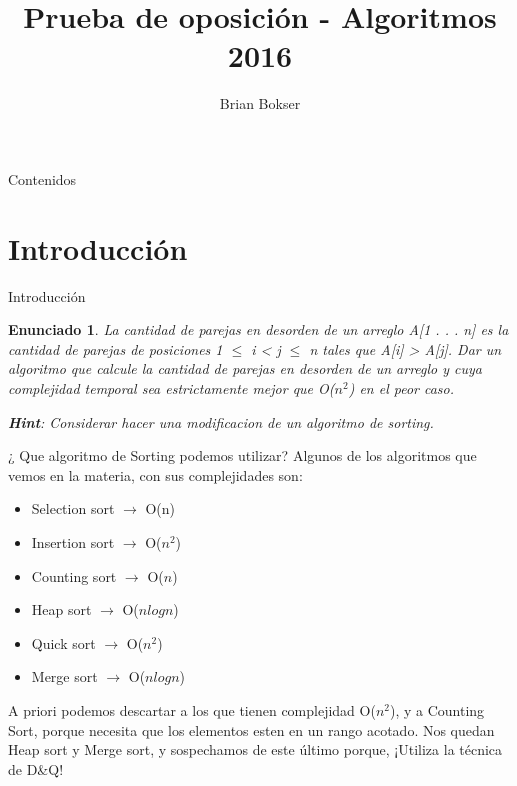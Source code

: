 \documentclass[pdf]{beamer}
\title[Prueba de oposición] %
{Prueba de oposición - Algoritmos 2016}
\author[Brian Bokser] %
{Brian Bokser}
\institute[UBA-FCEN] %
{
  Facultad de Ciencias Exactas y Naturales\\
  Universidad de Buenos Aires
}
\begin{document}
\begin{frame}
  \titlepage
\end{frame}

\begin{frame}{Contenidos}
  \tableofcontents
\end{frame}



\section{Introducci\'on}

\begin{frame}{Introducción}

\newtheorem{enun}{Enunciado}


\begin{enun}
    \par{
    La cantidad de parejas en desorden de un arreglo A[1 . . . n] es la cantidad de parejas de posiciones 1 $\leq$ i <
    j $\leq$ n tales que A[i] > A[j]. Dar un algoritmo que calcule la cantidad de parejas en desorden de un arreglo
    y cuya complejidad temporal sea estrictamente mejor que O($n^2$) en el peor caso.}
    \par{
    \textbf{Hint}: Considerar hacer una modificacion de un algoritmo de sorting.}

\end{enun}

\end{frame}

\begin{frame}{¿ Que algoritmo de Sorting podemos utilizar?}
    Algunos de los algoritmos que vemos en la materia, con sus complejidades son:
    \begin{itemize}
	\item Selection sort $\rightarrow$ O(n)
	\item Insertion sort $\rightarrow$ O($n^2$)
	\item Counting sort $\rightarrow$ O($ n $)
	\item Heap sort $\rightarrow$ O($n log n$)
	\item Quick sort $\rightarrow$ O($n^2$)
	\item Merge sort $\rightarrow$ O($n log n$)
     \end{itemize}
    
    A priori podemos descartar a los que tienen complejidad O($n^2$), y a Counting Sort, porque necesita que los
    elementos esten en un rango acotado.
    Nos quedan Heap sort y Merge sort, y sospechamos de este último porque, ¡Utiliza la técnica de D\&Q!
\end{frame}
\end{document}
